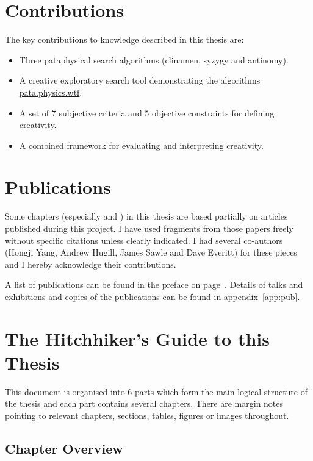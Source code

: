 \section{Contributions}

The key contributions to knowledge described in this thesis are:

\begin{itemize}
  \item Three pataphysical search algorithms (clinamen, syzygy and antinomy).
  \item A creative exploratory search tool demonstrating the algorithms \url{pata.physics.wtf}.
  \item A set of 7 subjective criteria and 5 objective constraints for defining creativity.
  \item A combined framework for evaluating and interpreting creativity.
\end{itemize}


\section{Publications}

Some chapters (especially  and ) in this thesis are based partially on articles published during this project. I have used fragments from those papers freely without specific citations unless clearly indicated. I had several co-authors (Hongji Yang, Andrew Hugill, James Sawle and Dave Everitt) for these pieces and I hereby acknowledge their contributions.

A list of publications can be found in the preface on page~\pageref{pre:pub}. Details of talks and exhibitions and copies of the publications can be found in appendix~\ref{app:pub}.


\section{The Hitchhiker's Guide to this Thesis}

This document is organised into \num{6} parts which form the main logical structure of the thesis and each part contains several chapters. There are margin notes pointing to relevant chapters, sections, tables, figures or images throughout.


\subsection{Chapter Overview}

